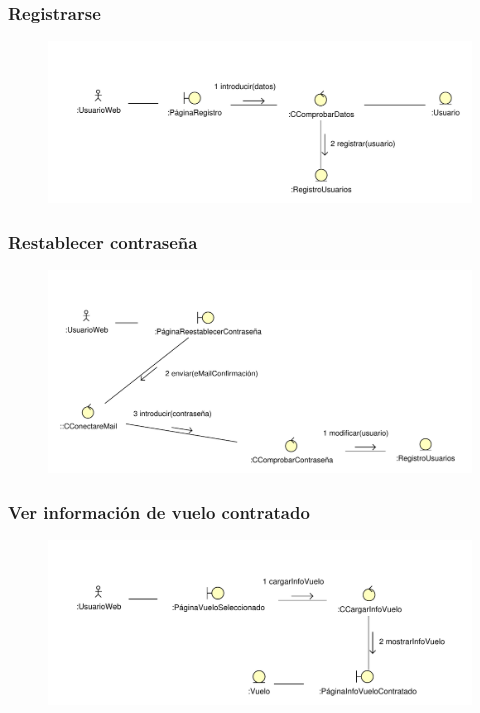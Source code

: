 \documentclass[11pt, a4paper, twoside, titlepage]{article}
\begin{document}
			\subsubsection{Registrarse}
				\begin{figure}[H]\centering
					\includegraphics[scale=.8]{diagramas/registrarse.pdf}
				\end{figure}

			\subsubsection{Restablecer contraseña}
				\begin{figure}[H]\centering
					\includegraphics[scale=.77]{diagramas/restablecercontrasena.pdf}
				\end{figure}

			\subsubsection{Ver información de vuelo contratado}
				\begin{figure}[H]\centering
					\includegraphics[scale=.8]{diagramas/verinfovuelocontratado.pdf}
				\end{figure}
\end{document}
